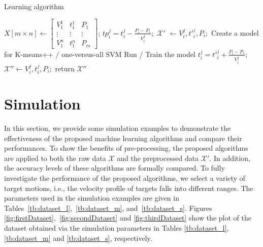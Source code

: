 \documentclass[letterpaper, 10 pt, conference]{ieeeconf}
\begin{document}
\begin{algorithm}
\caption{Learning algorithm}\label{alg:K-means}
\begin{algorithmic}[1]
\State $X[m \times n] \leftarrow \begin{bmatrix}
V_1^1 &t_1^1  &P_1 \\ 
 \vdots& \vdots &\vdots \\ 
 V_1^n&t_1^n  & P_m
\end{bmatrix}$;
\EndWhile
{}
\State $tp_i^j = t_i^j - \frac{P_i- P_1}{V_i^j};$
\State $\mathcal{X'}$ $\leftarrow V_i^j, {t'}_i^j, P_i;$
\EndWhile
\State Create a model for K-means++ / one-versus-all SVM
\State Run / Train the model
\State $t_i^j = {t'}_i^j + \frac{P_i-P_1}{V_i^j};$
\State $\mathcal{X}'' \leftarrow V_i^j, {t}_i^j, P_i;$
\EndWhile
\State return $\mathcal{X}''$
\end{algorithmic}
\end{algorithm}



\section{Simulation}\label{sec:simu}

In this section, we provide some simulation examples to demonstrate the effectiveness of the proposed machine learning algorithms and compare their performances. To show the benefits of pre-processing, the proposed algorithms are applied to both the raw data $\mathcal{X}$ and the preprocessed data $\mathcal{X}'$. In addition, the accuracy levels of these algorithms are formally compared. To fully investigate the performance of the proposed algorithms, we select a variety of target motions, i.e., the velocity profile of targets falls into different ranges. The parameters used in the simulation examples are given in Tables~\ref{tb:dataset_l},~\ref{tb:dataset_m}, and~\ref{tb:dataset_s}. Figures \ref{fig:firstDataset},~\ref{fig:secondDataset} and \ref{fig:thirdDataset} show the plot of the dataset obtained via the simulation parameters in Tables \ref{tb:dataset_l}, \ref{tb:dataset_m} and \ref{tb:dataset_s}, respectively.
\end{document}

